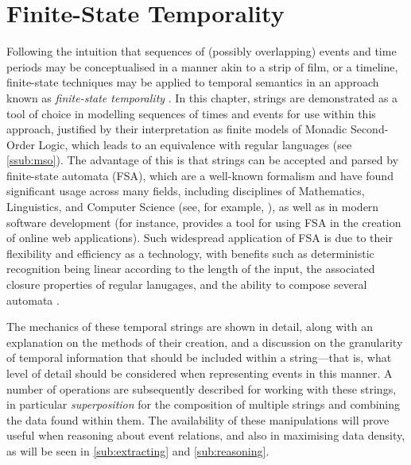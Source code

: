 \documentclass[a4paper,12pt,leqno]{article}
\begin{document}
\section{Finite-State Temporality}\label{sec:fst}
Following the intuition that sequences of (possibly overlapping) events and time periods may be conceptualised in a manner akin to a strip of film, or a timeline, finite-state techniques may be applied to temporal semantics in an approach known as \textit{finite-state temporality} \citep{fernando2005entailments}. In this chapter, strings are demonstrated as a tool of choice in modelling sequences of times and events for use within this approach, justified by their interpretation as finite models of Monadic Second-Order Logic, which leads to an equivalence with regular languages (see \cref{ssub:mso}). The advantage of this is that strings can be accepted and parsed by finite-state automata (FSA), which are a well-known formalism and have found significant usage across many fields, including disciplines of Mathematics, Linguistics, and Computer Science (see, for example, \citet{buchner1993finite,veanes2012symbolic}), as well as in modern software development (for instance, \citet{khourshid_2015} provides a tool for using FSA in the creation of online web applications). Such widespread application of FSA is due to their flexibility and efficiency as a technology, with benefits such as deterministic recognition being linear according to the length of the input, the associated closure properties of regular lanugages, and the ability to compose several automata \citep{wintner2007finite}.

The mechanics of these temporal strings are shown in detail, along with an explanation on the methods of their creation, and a discussion on the granularity of temporal information that should be included within a string---that is, what level of detail should be considered when representing events in this manner. A number of operations are subsequently described for working with these strings, in particular \textit{superposition} for the composition of multiple strings and combining the data found within them. The availability of these manipulations will prove useful when reasoning about event relations, and also in maximising data density, as will be seen in \cref{sub:extracting} and \cref{sub:reasoning}.
\end{document}
